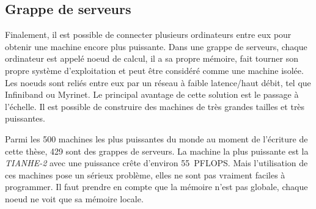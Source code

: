 \subsection{Grappe de serveurs}
Finalement, il est possible de connecter plusieurs ordinateurs entre eux pour obtenir une machine encore plus puissante.
%
Dans une grappe de serveurs, chaque ordinateur est appelé noeud de calcul, il a sa propre mémoire, fait tourner son propre système d'exploitation et peut être considéré comme une machine isolée.
%
Les noeuds sont reliés entre eux par un réseau à faible latence/haut débit, tel que Infiniband ou Myrinet.
%
Le principal avantage de cette solution est le passage à l'échelle.
%
Il est possible de construire des machines de très grandes tailles et très puissantes.

Parmi les 500 machines les plus puissantes du monde au moment de l'écriture de cette thèse, 429 sont des grappes de serveurs.
%
La machine la plus puissante est la {\em TIANHE-2} avec une puissance crête d'environ 55~PFLOPS.
%
Mais l'utilisation de ces machines pose un sérieux problème, elles ne sont pas vraiment faciles à programmer.
%
Il faut prendre en compte que la mémoire n'est pas globale, chaque noeud ne voit que sa mémoire locale.
